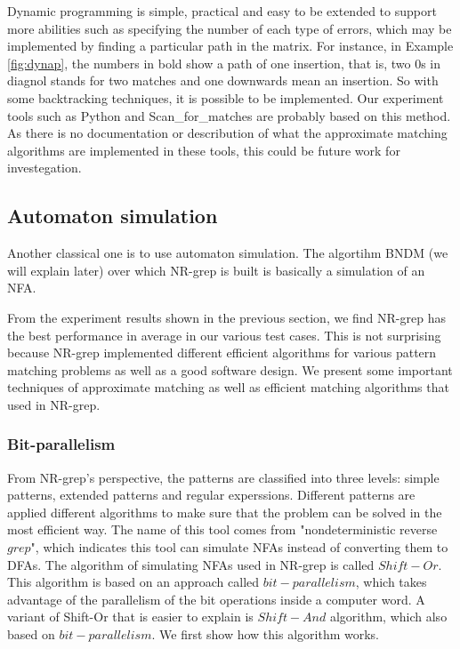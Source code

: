 Dynamic programming is simple, practical and easy to be extended to support more abilities such as specifying the number of each type of errors, which may be implemented by finding a particular path in the matrix. For instance, in Example \ref{fig:dynap},  the numbers in bold show a path of one insertion, that is, two 0s in diagnol stands for two matches and one downwards mean an insertion. So with some backtracking techniques, it is possible to be implemented. Our experiment tools such as Python and Scan\_for\_matches are probably based on this method. As there is no documentation or describution of what the approximate matching algorithms are implemented in these tools, this could be future work for investegation.

\subsection{Automaton simulation}
Another classical one is to use automaton simulation. The algortihm BNDM  (we will explain later) over which NR-grep is built is basically a simulation of an NFA. 

From the experiment results shown in the previous section, we find NR-grep has the best performance in average in our various test cases. This is not surprising because NR-grep implemented different efficient algorithms for various pattern matching problems as well as a good software design. We present some important techniques of approximate matching as well as efficient matching algorithms that used in NR-grep.

\subsubsection{Bit-parallelism}

From NR-grep's perspective, the patterns are classified into three levels: simple patterns, extended patterns and regular experssions. Different patterns are applied  different algorithms to make sure that the problem can be solved in the most efficient way. The name of this tool comes from "nondeterministic reverse $grep$", which indicates this tool can simulate NFAs instead of converting them to DFAs. The algorithm of  simulating NFAs used in NR-grep is called $Shift-Or$. This algorithm is based on an approach called $bit-parallelism$, which takes advantage of the parallelism of the bit operations inside a computer word. A variant of Shift-Or that is easier to explain is $Shift-And$ algorithm, which also based on $bit-parallelism$. We first show how this algorithm works. 

